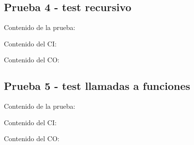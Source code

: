\documentclass[11pt, , a4paper, titlepage]{article}
\newenvironment{changemargin}[2]{%
\begin{list}{}{%
\setlength{\topsep}{0pt}%
\setlength{\leftmargin}{#1}%
\setlength{\rightmargin}{#2}%
\setlength{\listparindent}{\parindent}%
\setlength{\itemindent}{\parindent}%
\setlength{\parsep}{\parskip}%
}%
\item[]}{\end{list}}
\begin{document}
\clearpage

\subsection{Prueba 4 - test recursivo}
\vspace{2mm}
Contenido de la prueba:
\vspace{2mm}
\begin{changemargin}{+3cm}{+2cm}
    
\end{changemargin} 
\vspace{2mm}
Contenido del CI:
\vspace{2mm}
\begin{changemargin}{+1cm}{+0cm}
    
\end{changemargin} 
\vspace{2mm}
Contenido del CO:
\vspace{2mm}
\begin{changemargin}{+1cm}{-2cm}
    
\end{changemargin} 

\clearpage

\subsection{Prueba 5 - test llamadas a funciones}
\vspace{2mm}
Contenido de la prueba:
\vspace{2mm}
\begin{changemargin}{+3cm}{+2cm}
    
\end{changemargin} 
\vspace{2mm}
Contenido del CI:
\vspace{2mm}
\begin{changemargin}{+1cm}{+0cm}
    
\end{changemargin} 
\vspace{2mm}
Contenido del CO:
\vspace{2mm}
\begin{changemargin}{+1cm}{-2cm}
    
\end{changemargin} 


\clearpage
\printbibliography[heading=bibnumbered]
\end{document}
